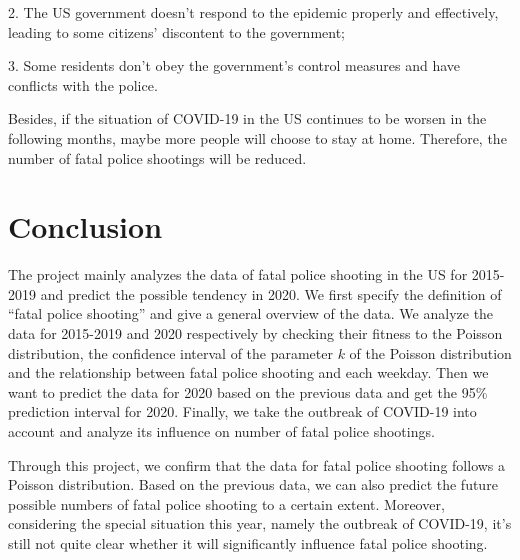 \documentclass[a4paper]{article}
\begin{document}
	2. The US government doesn't respond to the epidemic properly and effectively, leading to some citizens' discontent to the government;

	3. Some residents don't obey the government's control measures and have conflicts with the police.
	
	Besides, if the situation of COVID-19 in the US continues to be worsen in the following months, maybe more people will choose to stay at home. Therefore, the number of fatal police shootings will be reduced.



















\section{Conclusion}
	
	The project mainly analyzes the data of fatal police shooting in the US for 2015-2019 and predict the possible tendency in 2020. We first specify the definition of “fatal police shooting” and give a general overview of the data. We analyze the data for 2015-2019 and 2020 respectively by checking their fitness to the Poisson distribution, the confidence interval of the parameter $k$ of the Poisson distribution and the relationship between fatal police shooting and each weekday. Then we want to predict the data for 2020 based on the previous data and get the 95\% prediction interval for 2020. Finally, we take the outbreak of COVID-19 into account and analyze its influence on number of fatal police shootings.
	
	Through this project, we confirm that the data for fatal police shooting follows a Poisson distribution. Based on the previous data, we can also predict the future possible numbers of fatal police shooting to a certain extent. Moreover, considering the special situation this year, namely the outbreak of COVID-19, it's still not quite clear whether it will significantly influence fatal police shooting.
\end{document}
